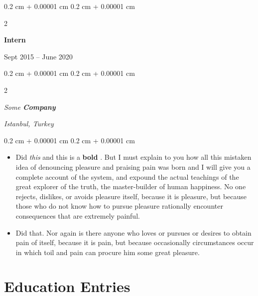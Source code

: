 \documentclass[10pt, letterpaper]{article}
\newenvironment{highlights}{
    \begin{itemize}[
        topsep=0.10 cm,
        parsep=0.10 cm,
        partopsep=0pt,
        itemsep=0pt,
        leftmargin=0.4 cm + 10pt
    ]
}{
    \end{itemize}
} %
\newenvironment{onecolentry}{
    \begin{adjustwidth}{
        0.2 cm + 0.00001 cm
    }{
        0.2 cm + 0.00001 cm
    }
}{
    \end{adjustwidth}
} %
\newenvironment{twocolentry}[2][]{
    \onecolentry
    \def\secondColumn{#2}
    \setcolumnwidth{\fill, 4.5 cm}
    \begin{paracol}{2}
}{
    \switchcolumn \raggedleft \secondColumn
    \end{paracol}
    \endonecolentry
} %
\let\hrefWithoutArrow\href
\renewcommand{\href}[2]{\hrefWithoutArrow{#1}{\ifthenelse{\equal{#2}{}}{ }{#2 }\raisebox{.15ex}{\footnotesize \faExternalLink*}}}
\begin{document}
        \vspace{0.2 cm}

                \begin{twocolentry}{
                    Sept 2015 – June 2020
                }
                \textbf{Intern}
                \end{twocolentry}
            \begin{twocolentry}{
        \textit{Istanbul, Turkey}    }
            \textit{Some \textbf{Company}}
            \end{twocolentry}

        \vspace{0.10 cm}
        \begin{onecolentry}
            \begin{highlights}
                \item Did \textit{this} and this is a \textbf{bold} \href{https://example.com}{link}. But I must explain to you how all this mistaken idea of denouncing pleasure and praising pain was born and I will give you a complete account of the system, and expound the actual teachings of the great explorer of the truth, the master-builder of human happiness. No one rejects, dislikes, or avoids pleasure itself, because it is pleasure, but because those who do not know how to pursue pleasure rationally encounter consequences that are extremely painful.
                \item Did that. Nor again is there anyone who loves or pursues or desires to obtain pain of itself, because it is pain, but because occasionally circumstances occur in which toil and pain can procure him some great pleasure.
            \end{highlights}
        \end{onecolentry}



    
    \section{Education Entries}
\end{document}
